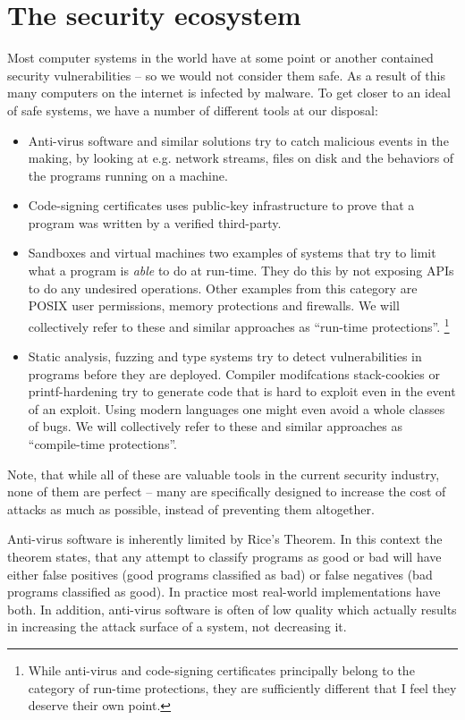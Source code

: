 \section{The security ecosystem}

Most computer systems in the world have at some point or another contained
security vulnerabilities -- so we would not consider them safe. As a result of
this many computers on the internet is infected by malware. To get closer to an
ideal of safe systems, we have a number of different tools at our disposal:

\begin{itemize}
\item Anti-virus software and similar solutions try to catch malicious events in
  the making, by looking at e.g. network streams, files on disk and the
  behaviors of the programs running on a machine.
\item Code-signing certificates uses public-key infrastructure to prove that a
  program was written by a verified third-party.
\item Sandboxes and virtual machines two examples of systems that try to limit
  what a program is \emph{able} to do at run-time. They do this by not exposing
  APIs to do any undesired operations. Other examples from this category are
  POSIX user permissions, memory protections and firewalls. We will collectively
  refer to these and similar approaches as ``run-time protections''.
  \footnote{
    While anti-virus and code-signing certificates principally belong to the
    category of run-time protections, they are sufficiently different that I
    feel they deserve their own point.
  }
\item Static analysis, fuzzing and type systems try to detect vulnerabilities in
  programs before they are deployed. Compiler modifcations stack-cookies or
  printf-hardening try to generate code that is hard to exploit even in the
  event of an exploit. Using modern languages one might even avoid a whole
  classes of bugs. We will collectively refer to these and similar approaches as
  ``compile-time protections''.
\end{itemize}

Note, that while all of these are valuable tools in the current security
industry, none of them are perfect -- many are specifically designed to increase
the cost of attacks as much as possible, instead of preventing them altogether.

Anti-virus software is inherently limited by Rice's Theorem. In this context the
theorem states, that any attempt to classify programs as good or bad will have
either false positives (good programs classified as bad) or false negatives (bad
programs classified as good). In practice most real-world implementations have
both. In addition, anti-virus software is often of low quality which actually
results in increasing the attack surface of a system, not decreasing
it.

